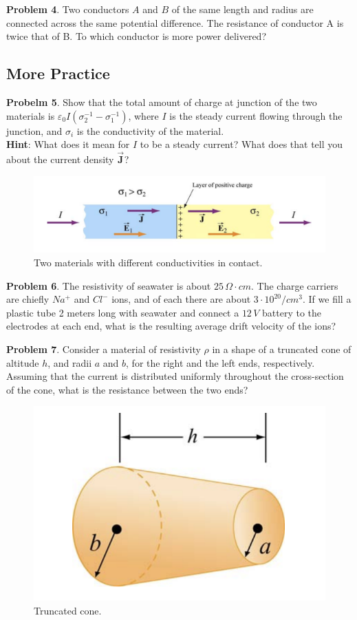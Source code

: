 \documentclass[11pt, letterpaper]{article}
\newcommand{\bv}[2][]{\bm{\vec{#2}_{#1}}}
\begin{document}
\textbf{Problem 4}. Two conductors $A$ and $B$ of the same length and radius are connected across the same potential difference. The resistance of conductor A is twice that of B. To which conductor is more power delivered?

\subsection{More Practice}
\textbf{Probelm 5}. Show that the total amount of charge at junction of the two materials is $\varepsilon_0I(\sigma_2^{-1} - \sigma_1^{-1})$, where $I$ is the steady current flowing through the junction, and $\sigma_i$ is the conductivity of the material.\\
\textbf{Hint}: What does it mean for $I$ to be a steady current? What does that tell you about the current density $\bv{J}$?
\begin{figure}[h!]
	\centering
	\includegraphics[scale=0.5]{junction.png}
	\caption{Two materials with different conductivities in contact.}
	\label{fig:junction}
\end{figure}

\textbf{Problem 6}. The resistivity of seawater is about $25\, \Omega\cdot cm$. The charge carriers are chiefly $Na^+$ and $Cl^-$ ions, and of each there are about $3\cdot 10^{20}/cm^3$. If we fill a plastic tube 2 meters long with seawater and connect a $12\, V$ battery to the electrodes at each end, what is the resulting average drift velocity of the ions?

\textbf{Problem 7}. Consider a material of resistivity $\rho$ in a shape of a truncated cone of altitude $h$, and radii $a$ and $b$, for the right and the left ends, respectively. Assuming that the current is distributed uniformly throughout the cross-section of the cone, what is the resistance between the two ends?
\begin{figure}[h!]
	\centering
	\includegraphics[scale=0.5]{trunc.png}
	\caption{Truncated cone.}
	\label{fig:truncated}
\end{figure}
\end{document}
